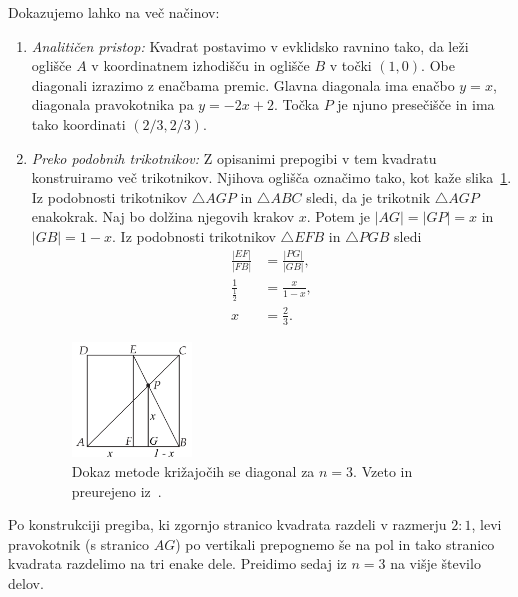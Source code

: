 \begin{dokaz}
    Dokazujemo lahko na več načinov:
    \begin{enumerate}
        \item \textit{Analitičen pristop:} Kvadrat postavimo v evklidsko ravnino tako, da leži oglišče $A$ v koordinatnem izhodišču in oglišče $B$ v točki $(1, 0)$. Obe diagonali izrazimo z enačbama premic. Glavna diagonala ima enačbo $y = x$, diagonala pravokotnika pa $y = -2x + 2$. Točka $P$ je njuno presečišče in ima tako koordinati $(2/3, 2/3)$.
        \item \textit{Preko podobnih trikotnikov:} Z opisanimi prepogibi v tem kvadratu konstruiramo več trikotnikov. Njihova oglišča označimo tako, kot kaže slika~\ref{fig:kriz_diag_3_dokaz}. Iz podobnosti trikotnikov $\triangle AGP$ in $\triangle ABC$ sledi, da je trikotnik $\triangle AGP$ enakokrak. Naj bo dolžina njegovih krakov $x$. Potem je $|AG| = |GP| = x$ in $|GB| = 1 - x$. Iz podobnosti trikotnikov $\triangle EFB$ in $\triangle PGB$ sledi
        \begin{align*}
            \frac{|EF|}{|FB|} &= \frac{|PG|}{|GB|}, \\
            \frac{1}{\frac{1}{2}} &= \frac{x}{1 - x}, \\
            x &= \frac{2}{3}.
        \end{align*}
        \begin{figure}[h]
            \centering
            \includegraphics[width=0.3\textwidth]{images/tretjinjenje_stranice2.png}
            \caption[Dokaz metode križajočih diagonal]{Dokaz metode križajočih se diagonal za $n=3$. Vzeto in preurejeno iz~\cite[str. 38]{hull2013}.}
            \label{fig:kriz_diag_3_dokaz}
        \end{figure}
    \end{enumerate}
\end{dokaz}

Po konstrukciji pregiba, ki zgornjo stranico kvadrata razdeli v razmerju $2:1$, levi pravokotnik (s stranico $AG$) po vertikali prepognemo še na pol in tako stranico kvadrata razdelimo na tri enake dele. Preidimo sedaj iz $n = 3$ na višje število delov.

